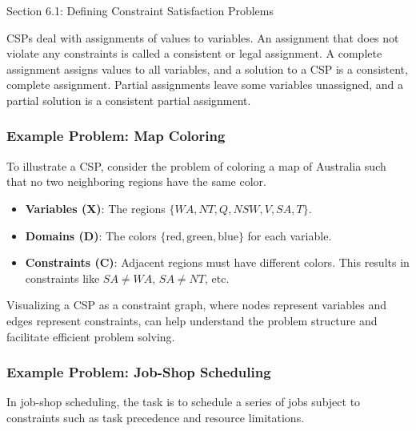 \begin{notes}{Section 6.1: Defining Constraint Satisfaction Problems}
\begin{highlight}
    \end{highlight}
    
    CSPs deal with assignments of values to variables. An assignment that does not violate any constraints is called a consistent or legal assignment. A complete assignment assigns values to all 
    variables, and a solution to a CSP is a consistent, complete assignment. Partial assignments leave some variables unassigned, and a partial solution is a consistent partial assignment.
    
    \subsubsection*{Example Problem: Map Coloring}
    
    To illustrate a CSP, consider the problem of coloring a map of Australia such that no two neighboring regions have the same color.
    
    \begin{highlight}
    
        \begin{itemize}
            \item \textbf{Variables (X)}: The regions $\{WA, NT, Q, NSW, V, SA, T\}$.
            \item \textbf{Domains (D)}: The colors $\{\text{red}, \text{green}, \text{blue}\}$ for each variable.
            \item \textbf{Constraints (C)}: Adjacent regions must have different colors. This results in constraints like $SA \neq WA$, $SA \neq NT$, etc.
        \end{itemize}
    
    \end{highlight}
    
    Visualizing a CSP as a constraint graph, where nodes represent variables and edges represent constraints, can help understand the problem structure and facilitate efficient problem solving.
    
    \subsubsection*{Example Problem: Job-Shop Scheduling}
    
    In job-shop scheduling, the task is to schedule a series of jobs subject to constraints such as task precedence and resource limitations.
    
    \begin{highlight}
    

\end{highlight}
\end{notes}
